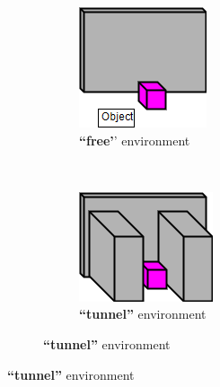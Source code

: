 \documentclass[12pt]{article}
\begin{document}
\begin{figure}[H]
\begin{subfigure}[t]{0.45\columnwidth}
    \centering
    \begin{subfigure}[t]{0.45\columnwidth}
        \includegraphics[width=\textwidth]{images/FreeEnvironment.png}
        \caption{\textbf{``free'}' environment}
    \end{subfigure} \ \ \ \ \ \
    \begin{subfigure}[t]{0.45\columnwidth}
        \includegraphics[width=\textwidth]{images/TunnelEnvironment.png}
        \caption{\textbf{``tunnel''} environment}
    \end{subfigure}
    

\end{subfigure}
\end{figure}
\end{document}
